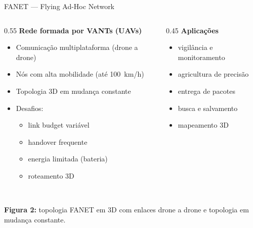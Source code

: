 \documentclass[aspectratio=169,11pt]{beamer}
\begin{document}
\begin{frame}{FANET --- Flying Ad-Hoc Network}
  \begin{columns}
    \begin{column}{0.55\textwidth}
      \textbf{Rede formada por VANTs (UAVs)}
      \begin{itemize}
        \item Comunicação multiplataforma (drone a drone)
        \item Nós com alta mobilidade (até 100~km/h)
        \item Topologia 3D em mudança constante
        \item Desafios:
          \begin{itemize}
            \item link budget variável
            \item handover frequente
            \item energia limitada (bateria)
            \item roteamento 3D
          \end{itemize}
      \end{itemize}
    \end{column}
    \begin{column}{0.45\textwidth}
      \textbf{Aplicações}
      \begin{itemize}
        \item vigilância e monitoramento
        \item agricultura de precisão
        \item entrega de pacotes
        \item busca e salvamento
        \item mapeamento 3D
      \end{itemize}
    \end{column}
  \end{columns}
  \begin{center}
    \\[1mm] {\scriptsize \textbf{Figura 2:} topologia FANET em 3D com enlaces drone a drone e topologia em mudança constante.}
  \end{center}
\end{frame}
\end{document}
